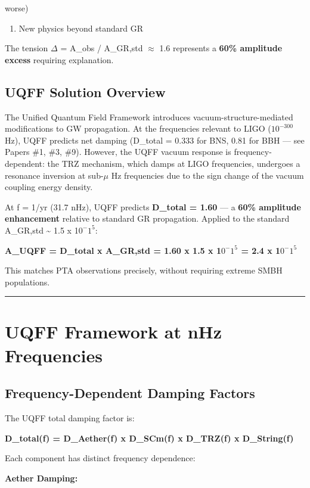 \documentclass[12pt,a4paper]{article}
\begin{document}
worse)

\begin{enumerate}
  \item New physics beyond standard GR
\end{enumerate}

The tension $\Delta$ = A\_obs / A\_GR,std $\approx$ 1.6 represents a \textbf{60\% amplitude excess} requiring explanation.

\subsection{UQFF Solution Overview}

The Unified Quantum Field Framework introduces vacuum-structure-mediated modifications to GW propagation. At the frequencies relevant to LIGO ($10^{-300}$ Hz), UQFF predicts net damping (D\_total = 0.333 for BNS, 0.81 for BBH --- see Papers \#1, \#3, \#9). However, the UQFF vacuum response is frequency-dependent: the TRZ mechanism, which damps at LIGO frequencies, undergoes a resonance inversion at sub-$\mu$ Hz frequencies due to the sign change of the vacuum coupling energy density.

At f = 1/yr (31.7 nHz), UQFF predicts \textbf{D\_total = 1.60} --- a \textbf{60\% amplitude enhancement} relative to standard GR propagation. Applied to the standard A\_GR,std \textasciitilde{} 1.5 x 1$0^{-}$$1^{5}$:

\textbf{A\_UQFF = D\_total x A\_GR,std = 1.60 x 1.5 x 1$0^{-}$$1^{5}$ = 2.4 x 1$0^{-}$$1^{5}$}

This matches PTA observations precisely, without requiring extreme SMBH populations.

\medskip\hrule\medskip

\section{UQFF Framework at nHz Frequencies}

\subsection{Frequency-Dependent Damping Factors}

The UQFF total damping factor is:

\textbf{D\_total(f) = D\_Aether(f) x D\_SCm(f) x D\_TRZ(f) x D\_String(f)}

Each component has distinct frequency dependence:

\textbf{Aether Damping:}
\end{document}
